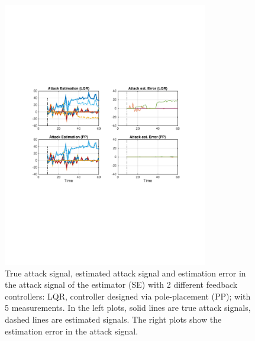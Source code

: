 \documentclass[../../thesis.tex]{subfiles}
\begin{document}
\begin{figure}
\center
\includegraphics[width=0.8\textwidth]{chapters/se_linear/figures/qh/uav_pp_est}
\caption{True attack signal, estimated attack signal and estimation error in the attack signal of the estimator (SE) with 2 different feedback controllers: LQR, controller designed via pole-placement (PP); with 5 measurements. In the left plots, solid lines are true attack signals, dashed lines are estimated signals. The right plots show the estimation error in the attack signal.}
\label{fig:ex_pp_est}
\end{figure}
\end{document}
